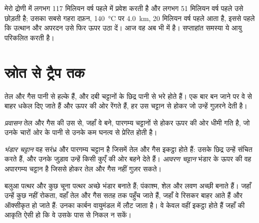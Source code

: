 मेरो द्रोणी में  लगभग 117
मिलियन वर्ष पहले  में प्रवेश करती है और लगभग 51 मिलियन वर्ष पहले उसे छोड़ती है; उसका सबसे गहरा
दफ़न, \qty{140}{\degreeCelsius} पर \qty{4.0}{km}, 20 मिलियन वर्ष
पहले आता है, इससे पहले कि उत्थान और अपरदन उसे फिर ऊपर उठा दें। आज वह अब भी 
में है। सप्ताहांत समस्या ये आयु परिकलित करती है।

\section{स्रोत से ट्रैप तक}

तेल और गैस पानी से हल्के हैं, और दबी चट्टानों के छिद्र पानी से भरे होते
हैं। एक बार बन जाने पर वे  से बाहर धकेल दिए जाते हैं और ऊपर की ओर रेंगते हैं,
हर उस चट्टान से होकर जो उन्हें गुज़रने देती है।

\begin{definition}[प्रवासन]\label{def:g11:fossil-fuel-geology:migration}
\emph{प्रवासन} तेल और गैस की उस  से,
जहाँ वे बने, पारगम्य चट्टानों से होकर ऊपर की ओर धीमी गति है, जो उनके
चारों ओर के पानी से उनके कम घनत्व से प्रेरित होती है।
\end{definition}

\begin{definition}[भंडार चट्टान; आवरण चट्टान]\label{def:g11:fossil-fuel-geology:reservoir}
\emph{भंडार चट्टान} वह सरंध्र और पारगम्य
चट्टान है जिसमें तेल और गैस इकट्ठा होते हैं: उसके छिद्र उन्हें संचित करते हैं, और उनके जुड़ाव
उन्हें किसी कुएँ की ओर बहने देते हैं। \emph{आवरण चट्टान} भंडार के ऊपर की
वह अपारगम्य चट्टान है जिससे होकर तेल और गैस नहीं
गुज़र सकते।
\end{definition}

बलुआ पत्थर और कुछ चूना पत्थर अच्छे भंडार बनाते हैं; पंकाश्म, शेल और
लवण अच्छी  बनाते हैं। जहाँ उन्हें कुछ नहीं रोकता, वहाँ तेल और गैस
सतह तक पहुँच जाते हैं, जहाँ वे रिसकर बाहर आते हैं और ऑक्सीकृत हो जाते हैं: उनका कार्बन
वायुमंडल में लौट जाता है। वे केवल वहीं इकट्ठा होते हैं जहाँ  की आकृति ऐसी हो कि वे
उसके पास से निकल न सकें।

